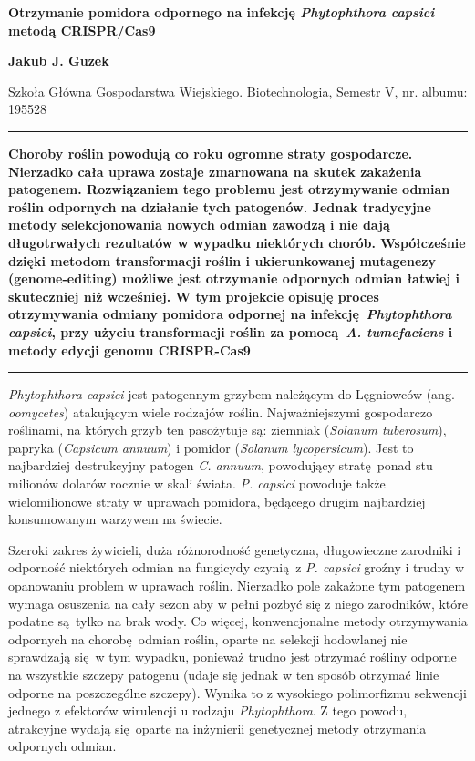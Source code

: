 \documentclass[two column, twoside, a4paper]{article}
\begin{document}
\begin{strip}
	{\sc \bfseries \LARGE {}\selectfont Otrzymanie pomidora odpornego na infekcję \textit{Phytophthora capsici} metodą CRISPR/Cas9} \vspace{\baselineskip}

{\bfseries \large Jakub J. Guzek}

{Szkoła Główna Gospodarstwa Wiejskiego. Biotechnologia, Semestr V, nr. albumu: 195528}\vspace{\baselineskip}

\hrule\vspace{\baselineskip}

	\textbf{\textsf{Choroby roślin powodują co roku ogromne straty gospodarcze. Nierzadko cała uprawa zostaje zmarnowana na skutek zakażenia patogenem. Rozwiązaniem tego problemu jest otrzymywanie odmian roślin odpornych na działanie tych patogenów. Jednak tradycyjne metody selekcjonowania nowych odmian zawodzą i nie dają długotrwałych rezultatów w wypadku niektórych chorób. Współcześnie dzięki metodom transformacji roślin i ukierunkowanej mutagenezy (genome-editing) możliwe jest otrzymanie odpornych odmian łatwiej i skuteczniej niż wcześniej. W tym projekcie opisuję proces otrzymywania odmiany pomidora odpornej na infekcję \textit{Phytophthora capsici}, przy użyciu transformacji roślin za pomocą \textit{A. tumefaciens} i metody edycji genomu CRISPR-Cas9}}\vspace{\baselineskip}

\hrule

\end{strip}

\textit{Phytophthora capsici} jest patogennym grzybem należącym do Lęgniowców (ang. \textit{oomycetes}) atakującym wiele rodzajów roślin. Najważniejszymi gospodarczo roślinami, na których grzyb ten pasożytuje są: ziemniak (\textit{Solanum tuberosum}), papryka (\textit{Capsicum annuum}) i pomidor (\textit{Solanum lycopersicum})\autocite{Lamour2012}. Jest to najbardziej destrukcyjny patogen \textit{C. annuum}, powodujący stratę ponad stu milionów dolarów rocznie w skali świata\autocite{Barchenger2018}. \textit{P. capsici} powoduje także wielomilionowe straty w uprawach pomidora, będącego drugim najbardziej konsumowanym warzywem na świecie.

Szeroki zakres żywicieli, duża różnorodność genetyczna, długowieczne zarodniki i odporność niektórych odmian na fungicydy czynią z \textit{P. capsici} groźny i trudny w opanowaniu problem w uprawach roślin. Nierzadko pole zakażone tym patogenem wymaga osuszenia na cały sezon aby w pełni pozbyć się z niego zarodników, które podatne są tylko na brak wody\autocite{Lamour2012}. Co więcej, konwencjonalne metody otrzymywania odpornych na chorobę odmian roślin, oparte na selekcji hodowlanej nie sprawdzają się w tym wypadku, ponieważ trudno jest otrzymać rośliny odporne na wszystkie szczepy patogenu (udaje się jednak w ten sposób otrzymać linie odporne na poszczególne szczepy\autocite{Sy2005}). Wynika to z wysokiego polimorfizmu sekwencji jednego z efektorów wirulencji u rodzaju \textit{Phytophthora}\autocite{Chen2019}. Z tego powodu, atrakcyjne wydają się oparte na inżynierii genetycznej metody otrzymania odpornych odmian.
\end{document}
